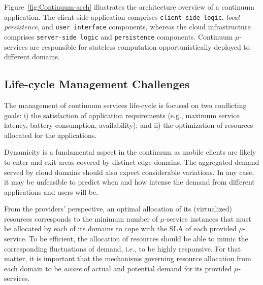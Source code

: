 Figure~\ref{fig:Continuum-arch} illustrates the architecture overview of a continuum application. The client-side application comprises \texttt{client-side logic}, \textit{local persistence}, and \texttt{user interface} components, whereas the cloud infrastructure comprises \texttt{server-side logic} and \texttt{persistence} components. Continuum $\mu$-services are responsible for stateless computation opportunistically deployed to different domains.

\subsection{Life-cycle Management Challenges}


The management of continuum services life-cycle is focused on two conflicting goals: i) the satisfaction of application requirements (e.g., maximum service latency, battery consumption, availability); and ii) the optimization of resources allocated for the applications. 

Dynamicity is a fundamental aspect in the continuum as mobile clients are likely to enter and exit areas covered by distinct edge domains. The aggregated demand served by cloud domains should also expect considerable variations. In any case, it may be unfeasible to predict when and how intense the demand from different applications and users will be. 

From the providers' perspective, an optimal allocation of its (virtualized) resources corresponds to the minimum number of $\mu$-service instances that must be allocated by each of its domains to cope with the SLA of each provided $\mu$-service. To be efficient, the allocation of resources should be able to mimic the corresponding fluctuations of demand, i.e., to be highly responsive. For that matter, it is important that the mechanisms governing resource allocation from each domain to be \textit{aware} of actual and potential demand for its provided $\mu$-services. 

